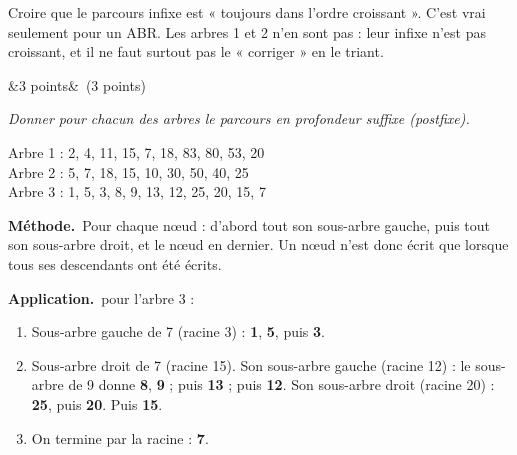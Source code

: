 \documentclass[11pt, a4paper]{exam}
\newcommand{\Q}[3]{\par\needspace{5\baselineskip}\bigskip\noindent{\large\bfseries Question #1}\ifx&#2&\else\ \textnormal{(#2)}\fi\par\nopagebreak\smallskip\noindent\textit{#3}\par\nopagebreak\smallskip}
\newcommand{\methode}{\par\noindent\textbf{Méthode.}\ }
\newcommand{\application}{\par\noindent\textbf{Application.}\ }
\begin{document}
\begin{erreur}
Croire que le parcours infixe est « toujours dans l'ordre croissant ». C'est vrai seulement pour un ABR. Les arbres 1 et 2 n'en sont pas : leur infixe n'est pas croissant, et il ne faut surtout pas le « corriger » en le triant.
\end{erreur}

\Q{10}{3 points}{Donner pour chacun des arbres le parcours en profondeur suffixe (postfixe).}
\begin{reponse}
Arbre 1 : 2, 4, 11, 15, 7, 18, 83, 80, 53, 20 \\
Arbre 2 : 5, 7, 18, 15, 10, 30, 50, 40, 25 \\
Arbre 3 : 1, 5, 3, 8, 9, 13, 12, 25, 20, 15, 7
\end{reponse}
\methode Pour chaque nœud : d'abord tout son sous-arbre gauche, puis tout son sous-arbre droit, et le nœud en dernier. Un nœud n'est donc écrit que lorsque tous ses descendants ont été écrits.

\application pour l'arbre 3 :
\begin{enumerate}
\item Sous-arbre gauche de 7 (racine 3) : \textbf{1}, \textbf{5}, puis \textbf{3}.
\item Sous-arbre droit de 7 (racine 15). Son sous-arbre gauche (racine 12) : le sous-arbre de 9 donne \textbf{8}, \textbf{9} ; puis \textbf{13} ; puis \textbf{12}. Son sous-arbre droit (racine 20) : \textbf{25}, puis \textbf{20}. Puis \textbf{15}.
\item On termine par la racine : \textbf{7}.
\end{enumerate}
\end{document}
